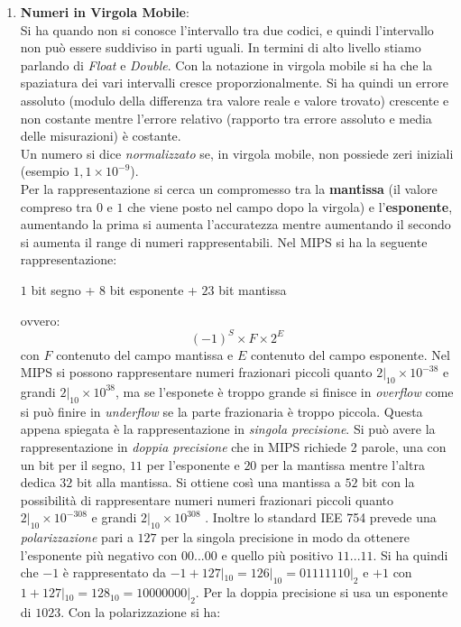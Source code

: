 \documentclass[a4paper,12pt, oneside]{book}
\begin{document}
\begin{enumerate}
	\item \textbf{Numeri in Virgola Mobile}:\\
	      Si ha quando non si conosce l'intervallo tra due codici, e quindi l'intervallo non può essere suddiviso in parti uguali. In termini di alto livello stiamo parlando di \textit{Float} e \textit{Double}. Con la notazione in virgola mobile si ha che la spaziatura dei vari intervalli cresce proporzionalmente. Si ha quindi un errore assoluto (modulo della differenza tra valore reale e valore trovato) crescente e non costante mentre l'errore relativo (rapporto tra errore assoluto e media delle misurazioni) è costante.\\
	      Un numero si dice \textit{normalizzato} se, in virgola mobile, non possiede zeri iniziali (esempio $1,1\times 10^{-9}$).\\
	      Per la rappresentazione si cerca un compromesso tra la \textbf{mantissa} (il valore compreso tra $0$ e $1$ che viene posto nel campo dopo la virgola) e l'\textbf{esponente}, aumentando la prima si aumenta l'accuratezza mentre aumentando il secondo si aumenta il range di numeri rappresentabili. Nel MIPS si ha la seguente rappresentazione:\\
	      \begin{center}
		      $1$ bit segno + $8$ bit esponente + $23$ bit mantissa
	      \end{center}
	      ovvero:
	      $$(-1)^S\times F\times 2^E$$
	      con $F$ contenuto del campo mantissa e $E$ contenuto del campo esponente. Nel MIPS si possono rappresentare numeri frazionari piccoli quanto $2|_{10}\times 10^{-38}$ e grandi $2|_{10}\times 10^{38}$, ma se l'esponete è troppo grande si finisce in \textit{overflow} come si può finire in \textit{underflow} se la parte frazionaria è troppo piccola. Questa appena spiegata è la rappresentazione in \textit{singola precisione}. Si può avere la rappresentazione in \textit{doppia precisione} che in MIPS richiede 2 parole, una con un bit per il segno, $11$ per l'esponente e $20$ per la mantissa mentre l'altra dedica $32$ bit alla mantissa. Si ottiene così una mantissa a $52$ bit con la possibilità di rappresentare numeri numeri frazionari piccoli quanto $2|_{10}\times 10^{-308}$ e grandi $2|_{10}\times 10^{308}$ .  Inoltre lo standard IEE 754 prevede una \textit{polarizzazione} pari a $127$ per la singola precisione in modo da ottenere l'esponente più negativo con $00...00$ e quello più positivo $11...11$. Si ha quindi che $-1$  è rappresentato da $-1+127|_{10}=126|_{10}=01111110|_2$ e $+1$ con $1+127|_{10}=128_{10}=10000000|_2$. Per la doppia precisione si usa un esponente di $1023$. Con la polarizzazione si ha:

\end{enumerate}
\end{document}
